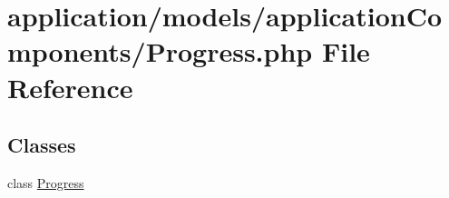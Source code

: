 \hypertarget{_progress_8php}{\section{application/models/application\-Components/\-Progress.php File Reference}
\label{_progress_8php}
}
\subsection*{Classes}
\begin{DoxyCompactItemize}
\item 
class \hyperlink{class_progress}{Progress}
\end{DoxyCompactItemize}
